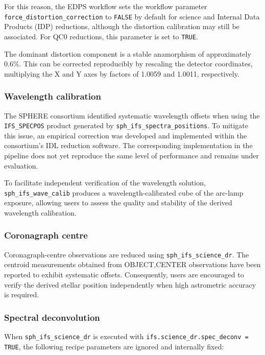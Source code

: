 For this reason, the EDPS workflow sets the workflow parameter
\texttt{force\_distortion\_correction} to \texttt{FALSE} by default for
science and Internal Data Products (IDP) reductions, although the distortion calibration may still
be associated. For QC0 reductions, this parameter is set to
\texttt{TRUE}.

The dominant distortion component is a stable anamorphism of
approximately 0.6\%. This can be corrected reproducibly by rescaling the
detector coordinates, multiplying the X and Y axes by factors of 1.0059
and 1.0011, respectively.

\subsubsection{Wavelength calibration}
\label{sec:wavel_calib}

The SPHERE consortium identified systematic wavelength offsets when using
the \texttt{IFS\_SPECPOS} product generated by
\texttt{sph\_ifs\_spectra\_positions}. To mitigate this issue, an
empirical correction was developed and implemented within the consortium's
IDL reduction software. The corresponding implementation in the pipeline
does not yet reproduce the same level of performance and remains under
evaluation.

To facilitate independent verification of the wavelength solution,
\texttt{sph\_ifs\_wave\_calib} produces a wavelength-calibrated cube of the
arc-lamp exposure, allowing users to assess the quality and stability of
the derived wavelength calibration.

\subsubsection{Coronagraph centre}
\label{sec:star_center}

Coronagraph-centre observations are reduced using
\texttt{sph\_ifs\_science\_dr}. The centroid measurements obtained from
OBJECT,CENTER observations have been reported to exhibit systematic
offsets. Consequently, users are encouraged to verify the derived stellar
position independently when high astrometric accuracy is required.

\subsubsection{Spectral deconvolution}
\label{sec:spt_deconv}

When \texttt{sph\_ifs\_science\_dr} is executed with
\texttt{ifs.science\_dr.spec\_deconv = TRUE}, the following recipe
parameters are ignored and internally fixed:

